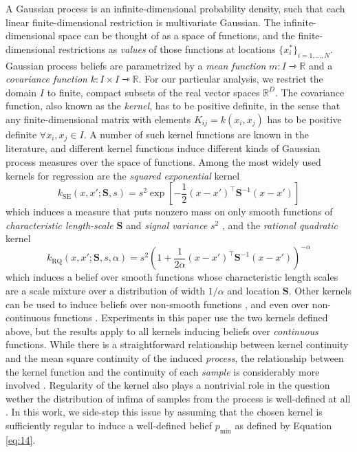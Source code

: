 \documentclass[twoside,11pt]{article}
\renewcommand{\Re}{\mathbb{R}}
\newcommand{\Trans}{^{\intercal}}
\newcommand{\pmin}{p_{\min}}
\renewcommand{\vec}{\boldsymbol}
\renewcommand{\to}{\rightarrowtriangle}
\begin{document}
A Gaussian process is an infinite-dimensional probability density,
such that each linear finite-dimensional restriction is multivariate
Gaussian. The infinite-dimensional space can be thought of as a space
of functions, and the finite-dimensional restrictions as \emph{values}
of those functions at locations $\{x^* _i \}_{i=1,\dots,N}$. Gaussian
process beliefs are parametrized by a \emph{mean function} $m:I\to\Re$
and a \emph{covariance function} $k:I \times I \to \Re$. For our
particular analysis, we restrict the domain $I$ to finite, compact
subsets of the real vector spaces $\Re^D$. The covariance function,
also known as the \emph{kernel}, has to be positive definite, in the
sense that any finite-dimensional matrix with elements $K_{ij} =
k(x_i,x_j)$ has to be positive definite $\forall x_i,x_j\in I$. A
number of such kernel functions are known in the literature, and
different kernel functions induce different kinds of Gaussian process
measures over the space of functions. Among the most widely used
kernels for regression are the \emph{squared exponential} kernel
\begin{equation}
  \label{eq:5}
  k_\text{SE}(x,x';\vec{S},s) = s^2 \exp\left[-\frac{1}{2} (x - x'
    )\Trans \vec{S}^{-1}(x-x')  \right]
\end{equation}
which induces a measure that puts nonzero mass on only smooth
functions of \emph{characteristic length-scale} $\vec{S}$ and
\emph{signal variance} $s^2$ \citep{mackay1998introduction}, and the
\emph{rational quadratic} kernel
\citep{matérn1960spatial,RasmussenWilliams}
\begin{equation}
  \label{eq:6}
  k_{\text{RQ}}(x,x';\vec{S},s,\alpha) = s^2 \left(1 + \frac{1}{2\alpha} (x - x'
    )\Trans \vec{S}^{-1}(x-x')\right)^{-\alpha}
\end{equation}
which induces a belief over smooth functions whose characteristic
length scales are a scale mixture over a distribution of width
$1/\alpha$ and location $\vec{S}$. Other kernels can be used to induce
beliefs over non-smooth functions \citep{matérn1960spatial}, and even
over non-continuous functions \citep{uhlenbeck1930theory}. Experiments
in this paper use the two kernels defined above, but the results apply
to all kernels inducing beliefs over \emph{continuous}
functions. While there is a straightforward relationship between
kernel continuity and the mean square continuity of the induced
\emph{process}, the relationship between the kernel function and the
continuity of each \emph{sample} is considerably more involved
\citep[][]{adler1981geometry}. Regularity of the kernel
also plays a nontrivial role in the question wether the distribution
of infima of samples from the process is well-defined at all
\citep{AdlerSuprema}. In this work, we side-step this issue by
assuming that the chosen kernel is sufficiently regular to induce a
well-defined belief $\pmin$ as defined by Equation \eqref{eq:14}.
\end{document}
